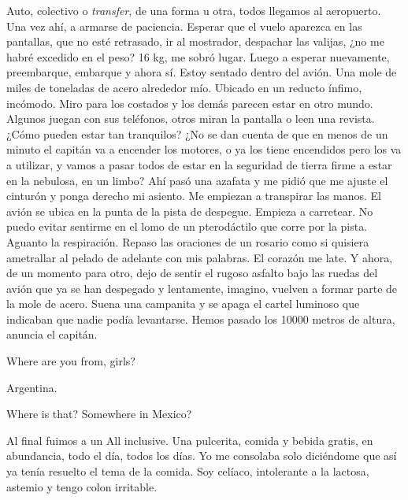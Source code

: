 \documentclass[12pt,twoside,openright,a5paper]{book}
\begin{document}
Auto, colectivo o \emph{transfer}, de una forma u otra, todos llegamos al
aeropuerto. Una vez ahí, a armarse de paciencia. Esperar que el vuelo
aparezca en las pantallas, que no esté retrasado, ir al mostrador,
despachar las valijas, ¿no me habré excedido en el peso? 16 kg, me sobró
lugar. Luego a esperar nuevamente, preembarque, embarque y ahora sí. Estoy
sentado dentro del avión. Una mole de miles de toneladas de acero alrededor
mío. Ubicado en un reducto ínfimo, incómodo. Miro para los costados y
los demás parecen estar en otro mundo. Algunos juegan con sus teléfonos,
otros miran la pantalla o leen una revista. ¿Cómo pueden estar tan
tranquilos? ¿No se dan cuenta de que en menos de un minuto el capitán va
a encender los motores, o ya los tiene encendidos pero los va a utilizar, y
vamos a pasar todos de estar en la seguridad de tierra firme a estar en la
nebulosa, en un limbo? Ahí pasó una azafata y me pidió que me ajuste el
cinturón y ponga derecho mi asiento. Me empiezan a transpirar las manos. El
avión se ubica en la punta de la pista de despegue. Empieza a carretear. No
puedo evitar sentirme en el lomo de un pterodáctilo que corre por la
pista. Aguanto la respiración. Repaso las oraciones de un rosario como si
quisiera ametrallar al pelado de adelante con mis palabras. El corazón me
late. Y ahora, de un momento para otro, dejo de sentir el rugoso asfalto
bajo las ruedas del avión que ya se han despegado y lentamente, imagino,
vuelven a formar parte de la mole de acero. Suena una campanita y se apaga
el cartel luminoso que indicaban que nadie podía levantarse. Hemos pasado
los 10000 metros de altura, anuncia el capitán.


\vspace{0.5cm}
\hrulefill\hspace{0.2cm} \decofourleft\decofourright \hspace{0.2cm} \hrulefill
\vspace{0.5cm}

Where are you from, girls?

Argentina.

Where is that? Somewhere in Mexico?


\vspace{0.5cm}
\hrulefill\hspace{0.2cm} \decofourleft\decofourright \hspace{0.2cm} \hrulefill
\vspace{0.5cm}

Al final fuimos a un All inclusive. Una pulcerita, comida y bebida gratis, en
abundancia, todo el día, todos los días. Yo me consolaba solo diciéndome
que así ya tenía resuelto el tema de la comida. Soy celíaco, intolerante
a la lactosa, astemio y tengo colon irritable.
\end{document}
